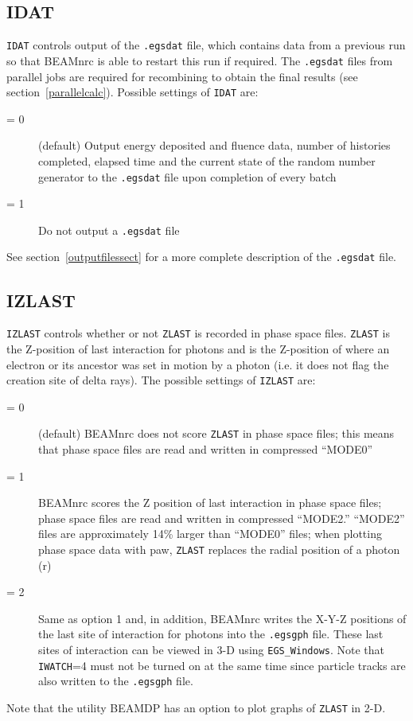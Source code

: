 \documentclass[12pt,twoside]{article}
\begin{document}
\subsection{IDAT}
\label{IDAT}

\verb+IDAT+ controls output of the \verb+.egsdat+ file, which contains data
from a previous run so that BEAMnrc is able to restart this run
if required.  The {\tt .egsdat} files from parallel jobs are
required for recombining to obtain the final results (see section~\ref{parallelcalc}).
Possible settings of \verb+IDAT+ are:

\begin{description}
\item [= 0] (default) Output energy deposited and fluence data,
number of histories completed, elapsed time and the current state of
the random number generator to the
{\tt .egsdat} file upon completion of every batch
\item [= 1] Do not output a {\tt .egsdat} file
\end{description}

See section~\ref{outputfilessect} for a more complete description of
the {\tt .egsdat} file.

\subsection{IZLAST}
\label{IZLAST}

\verb+IZLAST+ controls whether or not {\tt ZLAST}
is recorded in phase space files.
{\tt ZLAST} is the Z-position of last interaction for photons and is
the Z-position of where an electron or its ancestor was set in motion by
a photon (i.e. it does not flag the creation site of delta rays).
The possible settings of \verb+IZLAST+ are:
\begin{description}
\item [= 0] (default) BEAMnrc does not score
\verb+ZLAST+
in phase space files; this means that phase space files are read and
written in compressed ``MODE0''
\item [= 1] BEAMnrc scores the Z position of last interaction in phase
space files; phase space files are read and written in compressed ``MODE2.''
``MODE2'' files are approximately 14\% larger than ``MODE0'' files; when
plotting phase space data with paw,
\verb+ZLAST+ replaces the radial position
of a photon (r)
\item [= 2] Same as option 1 and, in addition, BEAMnrc writes the X-Y-Z positions
of the last site of interaction for photons into the \verb+.egsgph+ file.
These last sites of interaction can be viewed in 3-D using
{\tt EGS\_Windows}\cite{TR99a}. Note that {\tt IWATCH}=4 must not be turned on
at the same time since particle tracks are also written to the
\verb+.egsgph+ file.

\end{description}
Note that the utility BEAMDP has an option to plot graphs of {\tt ZLAST}
in 2-D.
\end{document}
